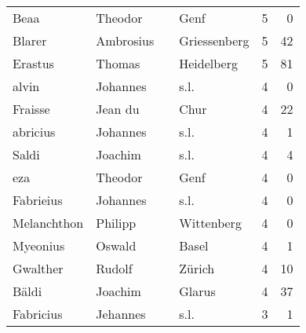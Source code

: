 \begin{center}
\begin{tiny}
\begin{longtabu}{llllrr}
                     Beaa &                            Theodor &             &                                        Genf &          5 &         0 \\
                   Blarer &                          Ambrosius &             &                                Griessenberg &          5 &        42 \\
                  Erastus &                             Thomas &             &                                  Heidelberg &          5 &        81 \\
                    alvin &                           Johannes &             &                                        s.l. &          4 &         0 \\
                  Fraisse &                            Jean du &             &                                        Chur &          4 &        22 \\
                 abricius &                           Johannes &             &                                        s.l. &          4 &         1 \\
                    Saldi &                            Joachim &             &                                        s.l. &          4 &         4 \\
                      eza &                            Theodor &             &                                        Genf &          4 &         0 \\
                Fabrieius &                           Johannes &             &                                        s.l. &          4 &         0 \\
              Melanchthon &                            Philipp &             &                                  Wittenberg &          4 &         0 \\
                 Myeonius &                             Oswald &             &                                       Basel &          4 &         1 \\
                 Gwalther &                             Rudolf &             &                                      Zürich &          4 &        10 \\
                    Bäldi &                            Joachim &             &                                      Glarus &          4 &        37 \\
                Fabricius &                           Jehannes &             &                                        s.l. &          3 &         1 \\

\end{longtabu}
\end{tiny}
\end{center}
